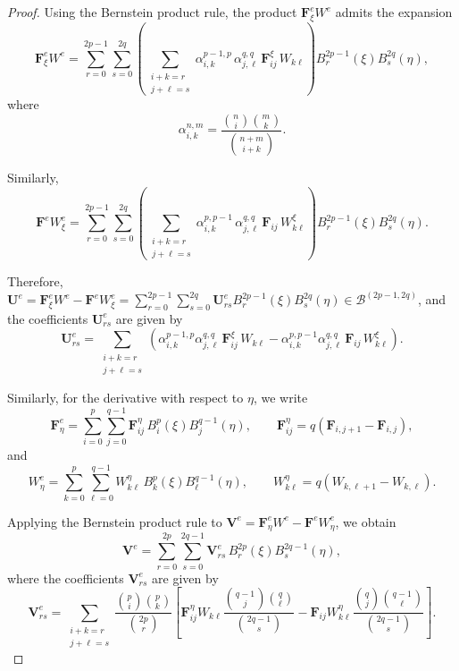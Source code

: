 \documentclass{jssc}
\begin{document}
\begin{proof}
Using the Bernstein product rule, the product $\mathbf{F}^e_\xi W^e$ admits the expansion
\begin{equation}
\mathbf{F}^e_\xi W^e
=
\sum_{r=0}^{2p-1}\sum_{s=0}^{2q}
\left(
\sum_{\substack{i+k=r \\ j+\ell=s}}
\alpha_{i,k}^{p-1,p} \, \alpha_{j,\ell}^{q,q}
\, \mathbf{F}^\xi_{ij} \, W_{k\ell}
\right)
B_r^{2p-1}(\xi) B_s^{2q}(\eta),
\end{equation}
where
\begin{equation}
\alpha_{i,k}^{n,m}
=
\frac{\binom{n}{i}\binom{m}{k}}{\binom{n+m}{i+k}}.
\end{equation}

Similarly,
\begin{equation}
\mathbf{F}^e W^e_\xi
=
\sum_{r=0}^{2p-1}\sum_{s=0}^{2q}
\left(
\sum_{\substack{i+k=r \\ j+\ell=s}}
\alpha_{i,k}^{p,p-1} \, \alpha_{j,\ell}^{q,q}
\, \mathbf{F}_{ij} \, W^\xi_{k\ell}
\right)
B_r^{2p-1}(\xi) B_s^{2q}(\eta).
\end{equation}

Therefore, $\mathbf{U}^e = \mathbf{F}^e_\xi W^e - \mathbf{F}^e W^e_\xi=\sum_{r=0}^{2p-1}\sum_{s=0}^{2q}\mathbf{U}^e_{rs}B_r^{2p-1}(\xi) B_s^{2q}(\eta) \in \mathcal{B}^{(2p-1,2q)}$, and  the coefficients $\mathbf{U}^e_{rs}$ are given by
\begin{equation}
\mathbf{U}^e_{rs}
=
\sum_{\substack{i+k=r \\ j+\ell=s}}
\left(
\alpha_{i,k}^{p-1,p} \alpha_{j,\ell}^{q,q} \, \mathbf{F}^\xi_{ij} \, W_{k\ell}
-
\alpha_{i,k}^{p,p-1} \alpha_{j,\ell}^{q,q} \, \mathbf{F}_{ij} \, W^\xi_{k\ell}
\right).
\end{equation}


Similarly, for the derivative with respect to $\eta$, we write
\begin{equation}
\mathbf{F}^e_\eta
=
\sum_{i=0}^{p}\sum_{j=0}^{q-1}
\mathbf{F}^\eta_{ij} \, B_i^{p}(\xi) B_j^{q-1}(\eta),
\qquad
\mathbf{F}^\eta_{ij}
=
q \left( \mathbf{F}_{i,j+1} - \mathbf{F}_{i,j} \right),
\end{equation}
and
\begin{equation}
W^e_\eta
=
\sum_{k=0}^{p}\sum_{\ell=0}^{q-1}
W^\eta_{k\ell} \, B_k^{p}(\xi) B_\ell^{q-1}(\eta),
\qquad
W^\eta_{k\ell}
=
q \left( W_{k,\ell+1} - W_{k,\ell} \right).
\end{equation}

Applying the Bernstein product rule to
$\mathbf{V}^e=\mathbf{F}^e_\eta W^e-\mathbf{F}^e W^e_\eta$,
we obtain
\begin{equation}
\mathbf{V}^e
=
\sum_{r=0}^{2p}\sum_{s=0}^{2q-1}
\mathbf{V}^e_{rs} \, B_r^{2p}(\xi) B_s^{2q-1}(\eta),
\end{equation}
where the coefficients $\mathbf{V}^e_{rs}$ are given by
\begin{equation}
\mathbf{V}^e_{rs}
=
\sum_{\substack{i+k=r \\ j+\ell=s}}
\frac{\binom{p}{i}\binom{p}{k}}{\binom{2p}{r}}
\left[
\mathbf{F}^\eta_{ij} W_{k\ell}
\frac{\binom{q-1}{j}\binom{q}{\ell}}{\binom{2q-1}{s}}
-
\mathbf{F}_{ij} W^\eta_{k\ell}
\frac{\binom{q}{j}\binom{q-1}{\ell}}{\binom{2q-1}{s}}
\right].
\end{equation}


\end{proof}
\end{document}
